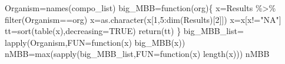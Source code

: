 \documentclass[
  letterpaper,
  DIV=11,
  numbers=noendperiod]{scrreprt}
\newenvironment{Shaded}{}{}
\newcommand{\AttributeTok}[1]{\textcolor[rgb]{0.78,0.47,0.87}{#1}}
\newcommand{\ConstantTok}[1]{\textcolor[rgb]{0.82,0.60,0.40}{#1}}
\newcommand{\ControlFlowTok}[1]{\textcolor[rgb]{0.78,0.47,0.87}{#1}}
\newcommand{\DecValTok}[1]{\textcolor[rgb]{0.82,0.60,0.40}{#1}}
\newcommand{\FunctionTok}[1]{\textcolor[rgb]{0.38,0.69,0.94}{#1}}
\newcommand{\NormalTok}[1]{\textcolor[rgb]{0.67,0.70,0.75}{#1}}
\newcommand{\OtherTok}[1]{\textcolor[rgb]{0.15,0.68,0.38}{#1}}
\newcommand{\SpecialCharTok}[1]{\textcolor[rgb]{0.34,0.71,0.76}{#1}}
\newcommand{\StringTok}[1]{\textcolor[rgb]{0.60,0.76,0.47}{#1}}
\begin{document}
\begin{Shaded}
\end{Shaded}

\begin{Shaded}
\begin{Highlighting}[]
\NormalTok{Organism}\OtherTok{=}\FunctionTok{names}\NormalTok{(compo\_list)}
\NormalTok{big\_MBB}\OtherTok{=}\ControlFlowTok{function}\NormalTok{(org)\{}
\NormalTok{  x}\OtherTok{=}\NormalTok{Results }\SpecialCharTok{\%\textgreater{}\%} \FunctionTok{filter}\NormalTok{(Organism}\SpecialCharTok{==}\NormalTok{org)}
\NormalTok{  x}\OtherTok{=}\FunctionTok{as.character}\NormalTok{(x[}\DecValTok{1}\NormalTok{,}\DecValTok{5}\SpecialCharTok{:}\FunctionTok{dim}\NormalTok{(Results)[}\DecValTok{2}\NormalTok{]])}
\NormalTok{  x}\OtherTok{=}\NormalTok{x[x}\SpecialCharTok{!=}\StringTok{"NA"}\NormalTok{]}
\NormalTok{  tt}\OtherTok{=}\FunctionTok{sort}\NormalTok{(}\FunctionTok{table}\NormalTok{(x),}\AttributeTok{decreasing=}\ConstantTok{TRUE}\NormalTok{)}
  \FunctionTok{return}\NormalTok{(tt)}
\NormalTok{  \}}
\NormalTok{big\_MBB\_list}\OtherTok{=} \FunctionTok{lapply}\NormalTok{(Organism,}\AttributeTok{FUN=}\ControlFlowTok{function}\NormalTok{(x) }\FunctionTok{big\_MBB}\NormalTok{(x))}
\NormalTok{nMBB}\OtherTok{=}\FunctionTok{max}\NormalTok{(}\FunctionTok{sapply}\NormalTok{(big\_MBB\_list,}\AttributeTok{FUN=}\ControlFlowTok{function}\NormalTok{(x) }\FunctionTok{length}\NormalTok{(x)))}
\NormalTok{nMBB}
\end{Highlighting}
\end{Shaded}
\end{document}
